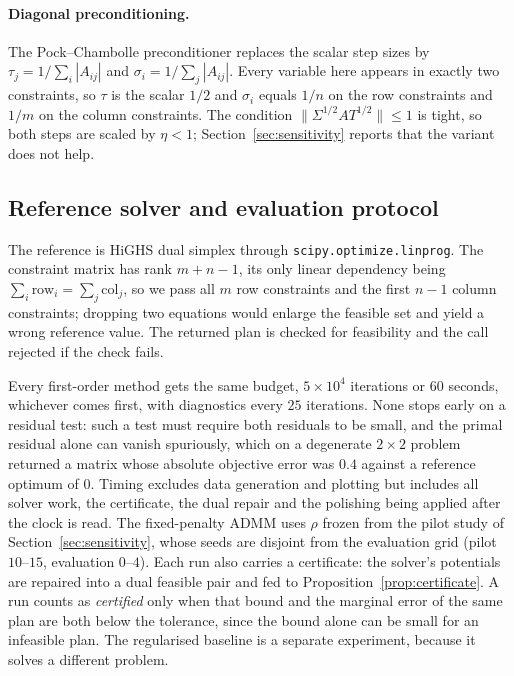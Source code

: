 \documentclass{article}
\begin{document}
\paragraph{Diagonal preconditioning.}
The Pock--Chambolle preconditioner replaces the scalar step sizes by
$\tau_j=1/\sum_i|A_{ij}|$ and $\sigma_i=1/\sum_j|A_{ij}|$. Every variable here appears in
exactly two constraints, so $\tau$ is the scalar $1/2$ and $\sigma_i$ equals $1/n$ on the
row constraints and $1/m$ on the column constraints. The condition
$\|\Sigma^{1/2}AT^{1/2}\|\le1$ is tight, so both steps are scaled by $\eta<1$;
Section~\ref{sec:sensitivity} reports that the variant does not help.

\subsection{Reference solver and evaluation protocol}

The reference is HiGHS dual simplex \citep{huangfu2018highs} through
\texttt{scipy.optimize.linprog}. The constraint matrix has rank $m+n-1$, its only linear
dependency being $\sum_i\text{row}_i=\sum_j\text{col}_j$, so we pass all $m$ row
constraints and the first $n-1$ column constraints; dropping two equations would enlarge
the feasible set and yield a wrong reference value. The returned plan is checked for
feasibility and the call rejected if the check fails.

Every first-order method gets the same budget, $5\times10^4$ iterations or $60$ seconds,
whichever comes first, with diagnostics every $25$ iterations. None stops early on a
residual test: such a test must require both residuals to be small, and the primal
residual alone can vanish spuriously, which on a degenerate $2\times2$ problem returned a
matrix whose absolute objective error was $0.4$ against a reference optimum of $0$.
Timing excludes data generation and plotting but includes all solver work, the
certificate, the dual repair and the polishing being applied after the clock is read. The
fixed-penalty ADMM uses $\rho$ frozen from the pilot study of
Section~\ref{sec:sensitivity}, whose seeds are disjoint from the evaluation grid (pilot
$10$--$15$, evaluation $0$--$4$). Each run also carries a certificate: the solver's
potentials are repaired into a dual feasible pair and fed to
Proposition~\ref{prop:certificate}. A run counts as \emph{certified} only when that bound
and the marginal error of the same plan are both below the tolerance, since the bound
alone can be small for an infeasible plan. The regularised baseline is a separate
experiment, because it solves a different problem.
\end{document}
